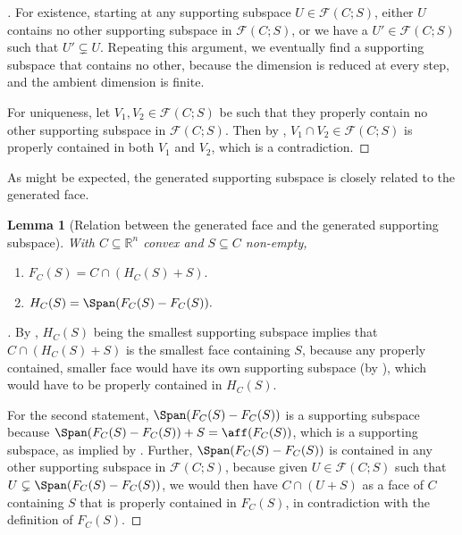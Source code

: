 \documentclass{article}
\theoremstyle{plain}
\newtheorem{lemma}{Lemma}[section]
\theoremstyle{definition}
\theoremstyle{remark}
\begin{document}
\begin{proof}[\hypertarget{loc:existence_and_uniqueness_of_the_generated_supporting_subspace.proof}Proof of \Cref{loc:existence_and_uniqueness_of_the_generated_supporting_subspace.statement}]

For existence, starting at any supporting subspace $U \in \mathcal{F}(C;S)$,
either $U$ contains no other supporting subspace in
$\mathcal{F}(C;S)$, or we have a $U' \in \mathcal{F}(C;S)$ such that
$U' \subsetneq U$. Repeating this argument, we eventually find
a supporting subspace that contains no other, because the dimension is reduced
at every step, and the ambient dimension is finite.

For uniqueness, let $V_1,  V_2 \in \mathcal{F}(C;S)$ be such that 
they properly contain no other 
supporting subspace in $\mathcal{F}(C;S)$. Then by
, $V_1 \cap V_2 \in \mathcal{F}(C;S)$ is properly contained in both $V_1$ and $V_2$, which is a contradiction.
\end{proof}
As might be expected, the generated supporting subspace is closely related to the generated face.
\begin{lemma}[Relation between the generated face and the generated supporting subspace]
\label{loc:relation_between_the_generated_face_and_the_generated_supporting_subspace.statement}
With $C \subseteq \mathbb{R}^n$ convex and $S \subseteq C$ non-empty,
\begin{enumerate}
\item $F_C(S) = C  \cap (H_C(S) + S).$
\item $H_C(S) = \Span(F_C(S)-F_C(S)).$
\end{enumerate}
\end{lemma}
\begin{proof}[\hypertarget{loc:relation_between_the_generated_face_and_the_generated_supporting_subspace.proof}Proof of \Cref{loc:relation_between_the_generated_face_and_the_generated_supporting_subspace.statement}]

By ,
$H_C(S)$ being the smallest supporting subspace implies that $C \cap (H_C(S) + S)$
is the smallest face containing $S$, because any properly contained, smaller face
would have its own supporting subspace (by ), which would have to be properly contained in $H_C(S)$.

For the second statement, $\Span(F_C(S)-F_C(S))$ is a supporting subspace because $\Span(F_C(S)-F_C(S)) + S = \aff(F_C(S))$,
which is a supporting
subspace, as implied by .
Further, $\Span(F_C(S)-F_C(S))$ is contained in any other supporting subspace in
$\mathcal{F}(C;S)$, because given $U \in \mathcal{F}(C;S)$ such that
$U \subsetneq \Span(F_C(S)-F_C(S))$, we would then have $C  \cap (U + S)$ as a face of
$C$ containing $S$ that is properly contained in $F_C(S)$, in contradiction with
the definition of $F_C(S)$.
\end{proof}
\end{document}
